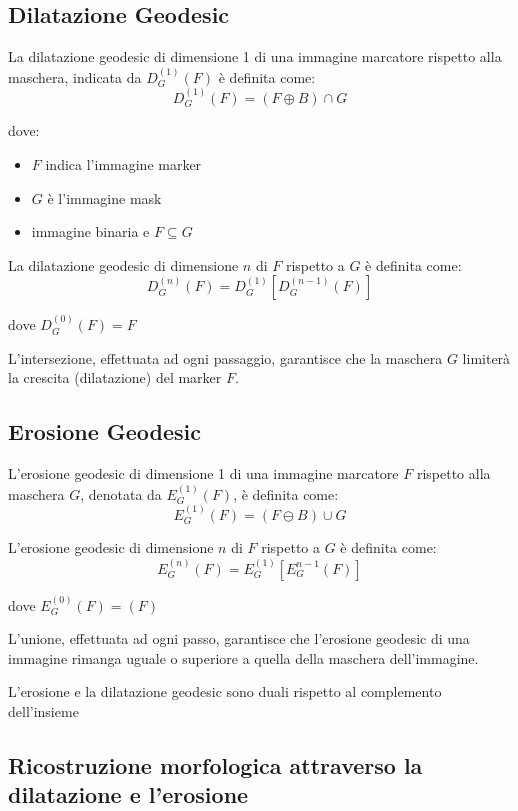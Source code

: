\subsection{Dilatazione Geodesic}
La dilatazione geodesic di dimensione 1 di una immagine marcatore rispetto alla maschera, indicata da $D_G^{(1)} (F)$ è definita come:
$$
D_G^{(1)} (F) = (F \oplus B) \cap G
$$

dove:
\begin{itemize}
	\item $F$ indica l'immagine marker
	\item $G$ è l'immagine mask
	\item immagine binaria e $F \subseteq G$
\end{itemize}

La dilatazione geodesic di dimensione $n$ di $F$ rispetto a $G$ è definita come:
$$
D_G^{(n)} (F) = D_G^{(1)}[D_G^{(n-1)} (F)]
$$

dove $D_G^{(0)} (F) = F$

L'intersezione, effettuata ad ogni passaggio, garantisce che la maschera $G$ limiterà la crescita (dilatazione) del marker $F$.

\subsection{Erosione Geodesic}
L'erosione geodesic di dimensione 1 di una immagine marcatore $F$ rispetto alla maschera $G$, denotata da $E_G^(1) (F)$, è definita come:
$$
E_G^(1) (F) = (F \ominus B) \cup G
$$

L'erosione geodesic di dimensione $n$ di $F$ rispetto a $G$ è definita come:
$$
E_G^{(n)} (F) = E_G^{(1)}[E_G^{n-1} (F)]
$$

dove $E_G^{(0)} (F) = (F)$

L'unione, effettuata ad ogni passo, garantisce che l'erosione geodesic di una immagine rimanga uguale o superiore a quella della maschera dell'immagine.

L'erosione  e la dilatazione geodesic sono duali rispetto al complemento dell'insieme

\subsection{Ricostruzione morfologica attraverso la dilatazione e l'erosione}

